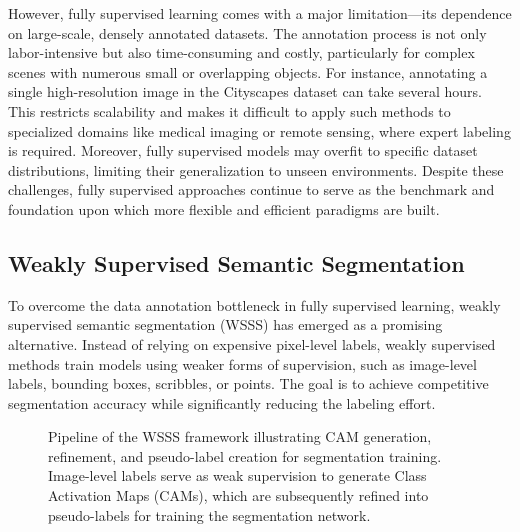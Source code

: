 However, fully supervised learning comes with a major limitation—its dependence on large-scale, densely annotated datasets. The annotation process is not only labor-intensive but also time-consuming and costly, particularly for complex scenes with numerous small or overlapping objects. For instance, annotating a single high-resolution image in the Cityscapes dataset can take several hours. This restricts scalability and makes it difficult to apply such methods to specialized domains like medical imaging or remote sensing, where expert labeling is required. Moreover, fully supervised models may overfit to specific dataset distributions, limiting their generalization to unseen environments. Despite these challenges, fully supervised approaches continue to serve as the benchmark and foundation upon which more flexible and efficient paradigms are built.

\subsection{Weakly Supervised Semantic Segmentation}
\label{subsec:weakly_supervised}
To overcome the data annotation bottleneck in fully supervised learning, weakly supervised semantic segmentation (WSSS) has emerged as a promising alternative. Instead of relying on expensive pixel-level labels, weakly supervised methods train models using weaker forms of supervision, such as image-level labels, bounding boxes, scribbles, or points. The goal is to achieve competitive segmentation accuracy while significantly reducing the labeling effort.

\begin{figure}[htbp]
    \centering
    \caption{Pipeline of the WSSS framework illustrating CAM generation, refinement, and pseudo-label creation for segmentation training. Image-level labels serve as weak supervision to generate Class Activation Maps (CAMs), which are subsequently refined into pseudo-labels for training the segmentation network.}
    \label{fig:wsss}
\end{figure}

